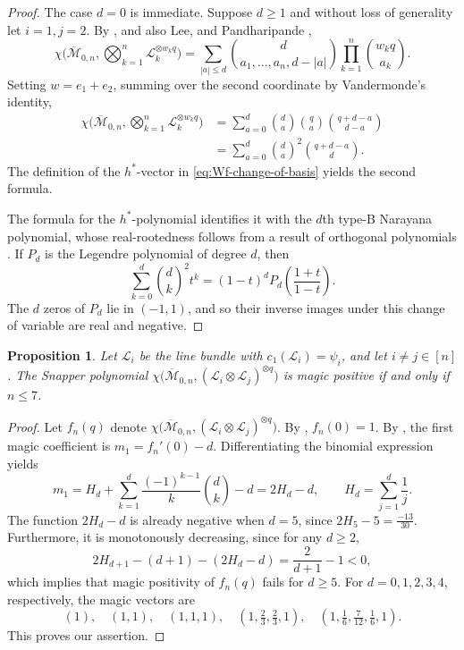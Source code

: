 \documentclass[11pt,a4paper,reqno]{amsart}
\theoremstyle{results}
\newtheorem{proposition}[thm]{Proposition}
\theoremstyle{definitions}
\newcommand{\hstar}{h^{*}}
\newcommand{\cL}{\mathcal{L}}
\newcommand{\Mbar}{\overline{\mathcal M}}
\begin{document}
\begin{proof}
  The case $d=0$ is immediate. Suppose $d \geqslant1$ and without loss of generality let $i = 1, j = 2$. By 
  \cite[Theorem 9.2]{larson2024k}, and also Lee, and Pandharipande
  \cite{lee1997formula,pandharipande1997symmetric},
  \begin{equation}\label{eq:llpp-psi}
    \chi\Big(\Mbar_{0,n},\bigotimes_{k=1}^n\cL_k^{\otimes w_k q}\Big)
    =\sum_{|a|\leqslant d}\binom{d}{a_1,\ldots,a_n,d-|a|}
      \prod_{k=1}^n\binom{w_k q}{a_k}.
  \end{equation}
  Setting $w=e_1+e_2$, summing over the second coordinate by Vandermonde's
  identity, 
  \begin{align*}
    \chi\Big(\Mbar_{0,n},\bigotimes_{k=1}^n\cL_k^{\otimes w_k q}\Big) &=\sum_{a=0}^d\binom da\binom qa\binom{q+d-a}{d-a}\\
        &=\sum_{a=0}^d\binom da^2\binom{q+d-a}{d}.
  \end{align*}
  The definition of the $\hstar$-vector in \eqref{eq:Wf-change-of-basis} yields the second formula.

  The formula for the $h^{\ast}$-polynomial identifies it with the $d$th type-B Narayana polynomial, whose real-rootedness follows from a result of orthogonal polynomials \cite{szego1975orthogonal}. If $P_d$ is the Legendre polynomial of degree $d$, then
  \[
    \sum_{k=0}^d\binom dk^2t^k
      =(1-t)^d P_d\!\left(\frac{1+t}{1-t}\right).
  \]
  The $d$ zeros of $P_d$ lie in $(-1,1)$, and so
  their inverse images under this change of variable are real and negative.
\end{proof}

\begin{proposition}
  Let $\cL_i$ be the line bundle with $c_1(\cL_i) = \psi_i$, and let $i \ne j \in [n]$.  
  The Snapper polynomial  
  $\chi\big(\Mbar_{0,n}, (\cL_i \otimes \cL_j)^{\otimes q}\big)$ is magic positive
  if and only if $n \leqslant 7$. 
\end{proposition}

\begin{proof}
  Let $f_n(q) $ denote $\chi\big(\Mbar_{0,n}, (\cL_i \otimes \cL_j)^{\otimes q}\big)$. 
  By , $f_n(0)=1$. By , the first magic coefficient is $m_1=f_n'(0)-d$.
  Differentiating the binomial expression yields
  \[
    m_1=H_d+\sum_{k=1}^d\frac{(-1)^{k-1}}k\binom dk-d=2H_d-d,
    \qquad H_d=\sum_{j=1}^d\frac1j.
  \]
  The function $2H_d - d$ is already negative when $d = 5$, since $2H_5-5=\frac{-13}{30}$. 
  Furthermore, it is monotonously decreasing, since for any $d \geqslant2$,
  \[
  2H_{d+1}-(d+1)-(2H_d-d)=\frac{2}{d+1}-1<0,
  \]
  which implies that magic positivity of $f_n(q)$ fails for $d\geqslant5$.
  For $d=0,1,2,3,4$, respectively, the magic vectors are
  \[
    (1),\quad(1,1),\quad(1,1,1),\quad
    (1,\tfrac23,\tfrac23,1),\quad
    (1,\tfrac16,\tfrac7{12},\tfrac16,1).
  \]
  This proves our assertion.
\end{proof}
\end{document}
